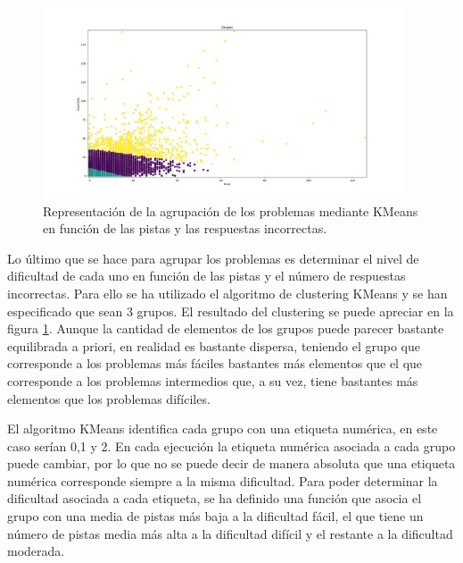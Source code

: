 \documentclass[acmtog, screen]{acmart}
\begin{document}
\begin{figure}[ht]
	\centering
	\includegraphics[width=0.95\textwidth]{grupos}
	\caption{Representación de la agrupación de los problemas mediante KMeans en función de las pistas y las respuestas incorrectas.}
	\label{fig:grupos}
\end{figure}

Lo último que se hace para agrupar los problemas es determinar el nivel de dificultad de cada uno en función de las pistas y el número de respuestas incorrectas. Para ello se ha utilizado el algoritmo de clustering KMeans y se han especificado que sean 3 grupos. El resultado del clustering se puede apreciar en la figura \ref{fig:grupos}. Aunque la cantidad de elementos de los grupos puede parecer bastante equilibrada a priori, en realidad es bastante dispersa, teniendo el grupo que corresponde a los problemas más fáciles bastantes más elementos que el que corresponde a los problemas intermedios que, a su vez, tiene bastantes más elementos que los problemas difíciles.

El algoritmo KMeans identifica cada grupo con una etiqueta numérica, en este caso serían 0,1 y 2. En cada ejecución la etiqueta numérica asociada a cada grupo puede cambiar, por lo que no se puede decir de manera absoluta que una etiqueta numérica corresponde siempre a la misma dificultad. Para poder determinar la dificultad asociada a cada etiqueta, se ha definido una función que asocia el grupo con una media de pistas más baja a la dificultad fácil, el que tiene un número de pistas media más alta a la dificultad difícil y el restante a la dificultad moderada. 
\end{document}
